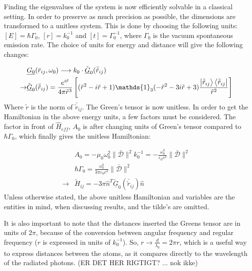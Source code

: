 \documentclass{article}
\begin{document}
Finding the eigenvalues of the system is now efficiently solvable in a classical setting. In order to preserve as much precision as possible, the dimensions are transformed to a unitless system. This is done by choosing the following units: $[E]=\hbar \Gamma_0$, $[r] = k_0^{-1}$ and $[t] = \Gamma_0^{-1}$, where $\Gamma_0$ is the vacuum spontaneous emission rate. The choice of units for energy and distance will give the following changes: 

\begin{equation}\label{eq:Green_unitless}
    \begin{split}
        &\underline{G_0}(\bar{r}_{ij}, \omega_0) \longrightarrow k_0 \cdot \tilde{\underline{G}}_0(\bar{\tilde{r}}_{ij}) \\
        \rightarrow &\tilde{\underline{G}}_0(\bar{\tilde{r}}_{ij}) = \frac{e^{i\tilde{r}}}{4\pi \tilde{r}^3} \left[ (\tilde{r}^2 - i\tilde{r} + 1) \mathds{1}_3 (-\tilde{r}^2 - 3i\tilde{r} + 3) \frac{\ket{\bar{\tilde{r}}_{ij}}\bra{\bar{\tilde{r}}_{ij}}}{\tilde{r}^2} \right]
    \end{split}
\end{equation}
Where $\tilde{r}$ is the norm of $\bar{\tilde{r}}_{ij}$. The Green's tensor is now unitless. In order to get the Hamiltonian in the above energy units, a few factors must be considered. The factor in front of $\hat{H}_{eff}$, $A_0$ is after changing units of Green's tensor compared to $\hbar \Gamma_0$, which finally gives the unitless Hamiltonian:

\begin{equation}\label{eq:Hamiltonian_unitless}
    \begin{split}
        &A_0 = -\mu_0 \omega_0^2 \| \bar{\mathscr{D}} \|^2 k_0^{-1} = - \frac{\omega_0^3}{\varepsilon_0 c^3} \| \bar{\mathscr{D}} \|^2 \\
        &\hbar \Gamma_0 = \frac{\omega_0^3}{3\pi \varepsilon_0 c^3} \| \bar{\mathscr{D}} \|^2 \\
        \longrightarrow & \tilde{H}_{ij} = -3 \pi \hat{n}^T \underline{\tilde{G}}_0 (\bar{\tilde{r}}_{ij}) \hat{n}
    \end{split}
\end{equation}
Unless otherwise stated, the above unitless Hamiltonian and variables are the entities in mind, when discussing results, and the tilde's are omitted. 

It is also important to note that the distances inserted the Greens tensor are in units of $2\pi$, because of the conversion between angular frequency and regular frequency ($r$ is expressed in units of $k_0^{-1}$). So, $r \rightarrow \frac{d}{\lambda_0} = 2 \pi r$, which is a useful way to express distances between the atoms, as it compares directly to the wavelength of the radiated photons. (ER DET HER RIGTIGT? ... nok ikke)
\end{document}

